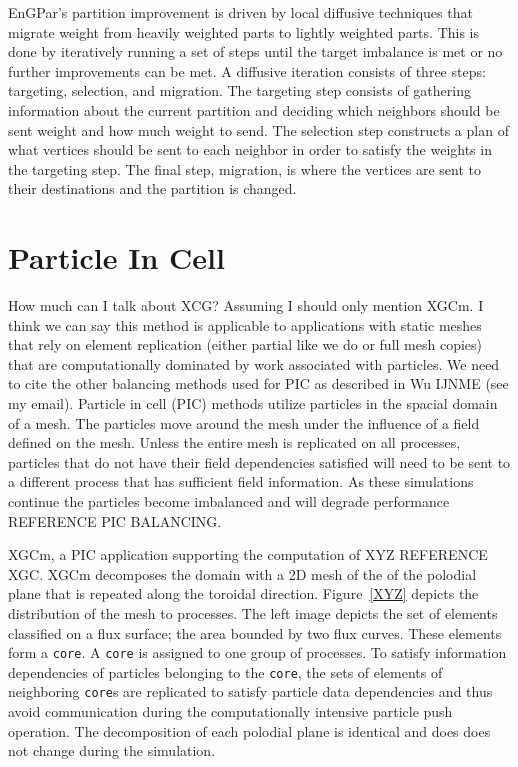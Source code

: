 \documentclass[conference]{IEEEtran}
\begin{document}
EnGPar's partition improvement is driven by local diffusive techniques that migrate weight
from heavily weighted parts to lightly weighted parts. This is done by iteratively running
a set of steps until the target imbalance is met or no further improvements can be met.
A diffusive iteration consists of three steps: targeting, selection, and migration.
The targeting step consists of gathering information about the current partition and deciding
which neighbors should be sent weight and how much weight to send. The selection step constructs
a plan of what vertices should be sent to each neighbor in order to satisfy the weights in
the targeting step. The final step, migration, is where the vertices are sent to their
destinations and the partition is changed.

\section{Particle In Cell}


{\color{red} How much can I talk about XCG? Assuming I should only mention XGCm.
I think we can say this method is applicable to applications with static meshes
that rely on element replication (either partial like we do or full mesh copies)
that are computationally dominated by work associated with particles.  We need
to cite the other balancing methods used for PIC as described in Wu IJNME (see
my email).}
Particle in cell (PIC) methods utilize particles in the spacial domain of a
mesh.
The particles move around the mesh under the influence of a field defined on the
mesh.
Unless the entire mesh is replicated on all processes, particles that do not
have their field dependencies satisfied will need to be
sent to a different process that has sufficient field information.
As these simulations continue the particles become imbalanced and will degrade
performance{\color{red} REFERENCE PIC BALANCING}.

XGCm, a PIC application supporting the computation of XYZ {\color{red} REFERENCE
XGC}.
XGCm decomposes the domain with a 2D mesh of the
of the polodial plane that is repeated along the toroidal direction.
Figure~\ref{XYZ} depicts the distribution of the mesh to processes.
The left image depicts the set of elements classified on a flux surface; the
area bounded by two flux curves.
These elements form a \texttt{core}.
A \texttt{core} is assigned to one group of processes.
To satisfy information dependencies of particles belonging to the \texttt{core},
the sets of elements of neighboring \texttt{core}s are replicated to satisfy
particle data dependencies and thus avoid communication during the
computationally intensive particle push operation.
The decomposition of each polodial plane is identical and does does not change
during the simulation.
\end{document}
